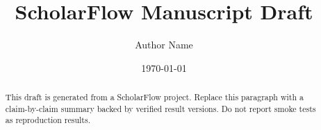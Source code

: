 \documentclass[11pt]{article}
\title{ScholarFlow Manuscript Draft}
\author{Author Name}
\date{\today}
\begin{document}
\maketitle

\begin{abstract}
This draft is generated from a ScholarFlow project. Replace this paragraph with a claim-by-claim
summary backed by verified result versions. Do not report smoke tests as reproduction results.
\end{abstract}











\end{document}
